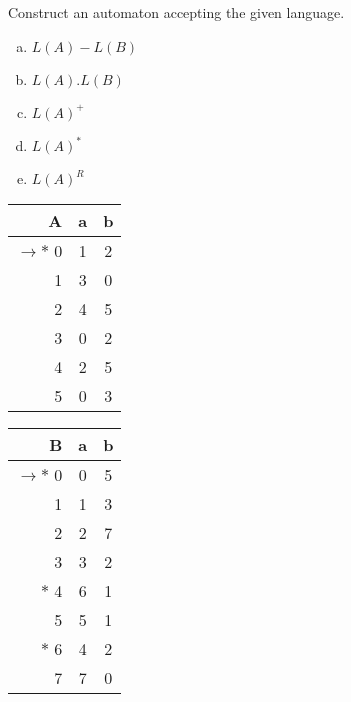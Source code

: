 \documentclass[a4paper,12pt]{amsart}
\begin{document}
\medskip\begin{problem} Construct an automaton accepting the given language.
    
    \begin{multicols}{3}
    
    \begin{enumerate}[(a)]\setlength\itemsep{3pt}
    \item $L(A)-L(B)$
    \item $L(A).L(B)$
    \item $L(A)^+$
    \item $L(A)^*$
    \item $L(A)^R$
    \end{enumerate}
    
    \begin{tabular}{ r | c c }
    A & a & b \\ \hline
     $\to\ast$ 0 & 1 & 2 \\  
     1 & 3 & 0 \\
     2 & 4 & 5 \\
     3 & 0 & 2 \\
     4 & 2 & 5 \\
     5 & 0 & 3
    \end{tabular}
    
    
    \begin{tabular}{ r | c c }
    B & a & b \\ \hline
     $\to\ast$ 0 & 0 & 5 \\  
     1 & 1 & 3 \\
     2 & 2 & 7 \\
     3 & 3 & 2 \\
    $\ast$ 4 & 6 & 1 \\
     5 & 5 & 1 \\
    $\ast$ 6 & 4 & 2 \\
    7 & 7 & 0
    \end{tabular}
    
    \end{multicols}
    
    
\end{problem}
\end{document}

